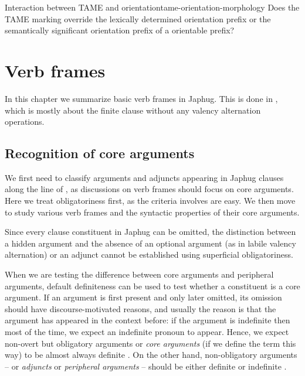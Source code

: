 \documentclass[a4paper, oneside, 12pt]{report}
\newcommand*{\citesec}[1]{\S~{#1}}
\newcommand*{\citepage}[1]{p.~{#1}}
\newcommand*{\term}[1]{\emph{#1}}
\begin{document}
\begin{todobox}{Interaction between TAME and orientation}{tame-orientation-morphology}
    Does the TAME marking override the lexically determined orientation prefix 
    or the semantically significant orientation prefix of a orientable prefix?
\end{todobox}

\chapter{Verb frames}

In this chapter we summarize basic verb frames in Japhug.
This is done in \citet[\citepage{14}]{jacques2021grammar},
which is mostly about the finite clause without any valency alternation operations.

\section{Recognition of core arguments}\label{sec:verb-frame.standard}

We first need to classify arguments and adjuncts appearing in Japhug clauses
along the line of ,
as discussions on verb frames should focus on core arguments.
Here we treat obligatoriness first,
as the criteria involves are easy.
We then move to study various verb frames and the syntactic properties of their core arguments.

Since every clause constituent in Japhug can be omitted,
the distinction between a hidden argument 
and the absence of an optional argument (as in labile valency alternation) or an adjunct 
cannot be established using superficial obligatoriness.

When we are testing the difference between core arguments and peripheral arguments,
default definiteness can be used to test whether a constituent is a core argument.
If an argument is first present and only later omitted, 
its omission should have discourse-motivated reasons,
and usually the reason is that the argument has appeared in the context before:
if the argument is indefinite then most of the time, we expect an indefinite pronoun to appear.
Hence, we expect non-overt but obligatory arguments or \term{core arguments}
(if we define the term this way)
to be almost always definite \citep[\citesec{22.1.2.1}]{jacques2021grammar}.
On the other hand, non-obligatory arguments 
-- or \term{adjuncts} or \term{peripheral arguments} --
should be either definite or indefinite
\citep[\citesec{22.1.2.2}]{jacques2021grammar}.
\end{document}
